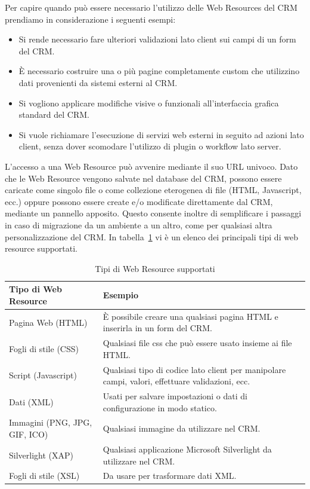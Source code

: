Per capire quando può essere necessario l'utilizzo delle Web Resources del CRM prendiamo in considerazione i seguenti esempi: 
\begin{itemize}
  \item Si rende necessario fare ulteriori validazioni lato client sui campi di un form del CRM.
  \item È necessario costruire una o più pagine completamente custom che utilizzino dati provenienti da sistemi esterni al CRM.
  \item Si vogliono applicare modifiche visive o funzionali all'interfaccia grafica standard del CRM.
  \item Si vuole richiamare l'esecuzione di servizi web esterni in seguito ad azioni lato client, senza dover scomodare l'utilizzo di plugin o workflow lato server.
\end{itemize}

L'accesso a una Web Resource può avvenire mediante il suo URL univoco. Dato che le Web Resource vengono salvate nel database del CRM, possono essere caricate come singolo file o come collezione eterogenea di file (HTML, Javascript, ecc.) oppure possono essere create e/o modificate direttamente dal CRM, mediante un pannello apposito. Questo consente inoltre di semplificare i passaggi in caso di migrazione da un ambiente a un altro, come per qualsiasi altra personalizzazione del CRM. In tabella~\ref{table:webResourceType} vi è un elenco dei principali tipi di web resource supportati.

\begin{table}[ht]
  \centering
  \begin{tabular}{lp{}}
    \toprule
      \textbf{Tipo di Web Resource} & \textbf{Esempio} \\ 
    \midrule
      Pagina Web (HTML) & È possibile creare una qualsiasi pagina HTML e inserirla in un form del CRM. \\
      \midrule 
      Fogli di stile (CSS) & Qualsiasi file css che può essere usato insieme ai file HTML. \\ 
      \midrule
      Script (Javascript) & Qualsiasi tipo di codice lato client per manipolare campi, valori, effettuare validazioni, ecc. \\ 
      \midrule
      Dati (XML) & Usati per salvare impostazioni o dati di configurazione in modo statico. \\
      \midrule 
      Immagini (PNG, JPG, GIF, ICO) & Qualsiasi immagine da utilizzare nel CRM.\\ 
      \midrule
      Silverlight (XAP) & Qualsiasi applicazione Microsoft Silverlight da utilizzare nel CRM. \\ 
      \midrule
      Fogli di stile (XSL) & Da usare per trasformare dati XML. \\ 
      \bottomrule
  \end{tabular}
  \caption{Tipi di Web Resource supportati}
  \label{table:webResourceType}
\end{table}

